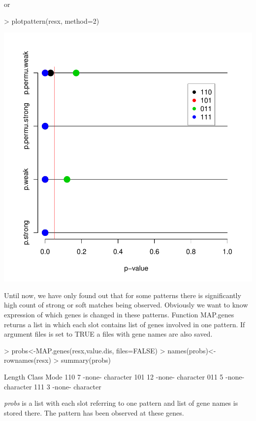\documentclass[a4paper]{report}
\begin{document}
or
\begin{center}
\begin{Schunk}
\begin{Sinput}
> plotpattern(resx, method=2)
\end{Sinput}
\end{Schunk}
\includegraphics{MAMA_full-056}
\end{center}
Until now, we have only found out that for some patterns there is significantly high count of strong or soft matches being observed. Obviously we want to know expression of which genes is changed in these patterns. Function {\ttfamily MAP.genes} returns a list in which each slot contains list of genes involved in one pattern. If argument {\ttfamily files} is set to {\ttfamily TRUE} a files with gene names are also saved. 
\begin{Schunk}
\begin{Sinput}
> probs<-MAP.genes(resx,value.dis, files=FALSE)
> names(probs)<-rownames(resx)
> summary(probs)
\end{Sinput}
\begin{Soutput}
    Length Class  Mode     
110  7     -none- character
101 12     -none- character
011  5     -none- character
111  3     -none- character
\end{Soutput}
\end{Schunk}
\emph{probs} is a list with each slot referring to one pattern and list of gene names is stored there. The pattern has been observed at these genes.  
\par
\end{document}
